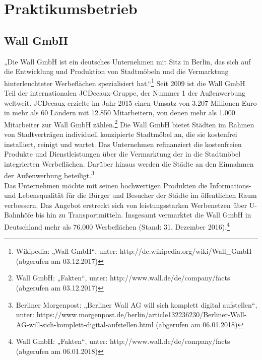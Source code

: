 \chapter{Praktikumsbetrieb}\label{chap:praktikumsbetrieb}
\section{Wall GmbH}\label{sec:wallgmbh}

„Die Wall GmbH ist ein deutsches Unternehmen mit Sitz in Berlin, das sich auf die Entwicklung und Produktion von Stadtmöbeln und die Vermarktung hinterleuchteter Werbeflächen spezialisiert hat.“\footnote{\label{foot:1}Wikipedia: „Wall GmbH“, unter: http://de.wikipedia.org/wiki/Wall\_GmbH (abgerufen am 03.12.2017)} Seit 2009 ist die Wall GmbH Teil der internationalen JCDecaux-Gruppe, der Nummer 1 der Außenwerbung weltweit. JCDecaux erzielte im Jahr 2015 einen Umsatz von 3.207 Millionen Euro in mehr als 60 Ländern mit 12.850 Mitarbeitern, von denen mehr als 1.000 Mitarbeiter zur Wall GmbH zählen.\footnote{\label{foot:2}Wall GmbH: „Fakten“, unter: http://www.wall.de/de/company/facts (abgerufen am 03.12.2017)} Die Wall GmbH bietet Städten im Rahmen von Stadtverträgen individuell konzipierte Stadtmöbel an, die sie kostenfrei installiert, reinigt und wartet. Das Unternehmen refinanziert die kostenfreien Produkte und Dienstleistungen über die Vermarktung der in die Stadtmöbel integrierten Werbeflächen. Darüber hinaus werden die Städte an den Einnahmen der Außenwerbung beteiligt.\footnote{\label{foot:3}Berliner Morgenpost: „Berliner Wall AG will sich komplett digital aufstellen“, unter: https://www.morgenpost.de/berlin/article132236230/Berliner-Wall-AG-will-sich-komplett-digital-aufstellen.html (abgerufen am 06.01.2018)} \\ Das Unternehmen möchte mit seinen hochwertigen Produkten die Informations- und Lebensqualität für die Bürger und Besucher der Städte im öffentlichen Raum verbessern. Das Angebot erstreckt sich von leistungsstarken Werbenetzen über U-Bahnhöfe bis hin zu Transportmitteln. Insgesamt vermarktet die Wall GmbH in Deutschland mehr als 76.000 Werbeflächen (Stand: 31. Dezember 2016).\footnote{\label{foot:4}Wall GmbH: „Fakten“, unter: http://www.wall.de/de/company/facts (abgerufen am 06.01.2018)} 

